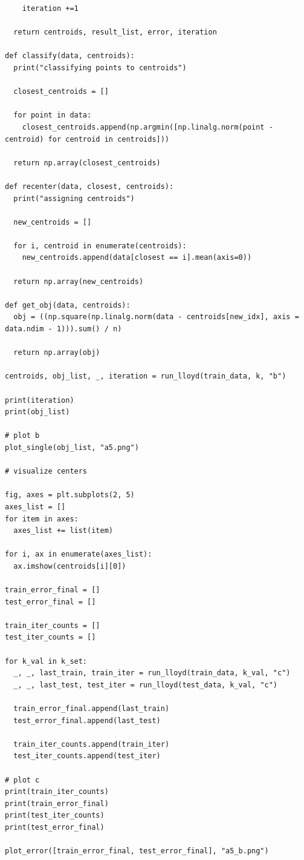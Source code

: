 \documentclass{article}
\newcommand{\1}{\mathbf{1}}
\begin{document}
{\begin{verbatim}
    iteration +=1
  
  return centroids, result_list, error, iteration

def classify(data, centroids):
  print("classifying points to centroids")

  closest_centroids = []

  for point in data:
    closest_centroids.append(np.argmin([np.linalg.norm(point - centroid) for centroid in centroids]))

  return np.array(closest_centroids)

def recenter(data, closest, centroids):
  print("assigning centroids")
  
  new_centroids = []

  for i, centroid in enumerate(centroids):
    new_centroids.append(data[closest == i].mean(axis=0))

  return np.array(new_centroids)

def get_obj(data, centroids):
  obj = ((np.square(np.linalg.norm(data - centroids[new_idx], axis = data.ndim - 1))).sum() / n)

  return np.array(obj)

centroids, obj_list, _, iteration = run_lloyd(train_data, k, "b")

print(iteration)
print(obj_list)

# plot b
plot_single(obj_list, "a5.png")

# visualize centers

fig, axes = plt.subplots(2, 5)
axes_list = []
for item in axes:
  axes_list += list(item)

for i, ax in enumerate(axes_list):
  ax.imshow(centroids[i][0])

train_error_final = []
test_error_final = []

train_iter_counts = []
test_iter_counts = []

for k_val in k_set:
  _, _, last_train, train_iter = run_lloyd(train_data, k_val, "c")
  _, _, last_test, test_iter = run_lloyd(test_data, k_val, "c")

  train_error_final.append(last_train)
  test_error_final.append(last_test)

  train_iter_counts.append(train_iter)
  test_iter_counts.append(test_iter)

# plot c
print(train_iter_counts)
print(train_error_final)
print(test_iter_counts)
print(test_error_final)

plot_error([train_error_final, test_error_final], "a5_b.png")
\end{verbatim}

\newpage

}
\end{document}
